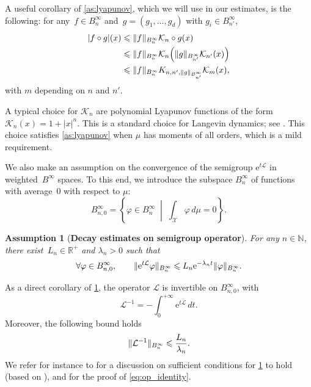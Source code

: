 \documentclass[11pt]{article}
\newcommand{\R}{\mathbb{R}}
\newcommand{\N}{\mathbb{N}}
\newcommand{\e}{\mathrm{e}}
\renewcommand{\L}{\mathcal{L}}
\renewcommand{\leq}{\leqslant}
\DeclarePairedDelimiter\norm{\lVert}{\rVert}
\DeclarePairedDelimiter\paren{\lparen}{\rparen}
\newtheorem{assumption}{Assumption}
\theoremstyle{definition}
\newcommand{\Binfz}{B_{n,0}^{\infty}}
\begin{document}
A useful corollary of \cref{as:lyapunov}, which we will use in our estimates, is the following: for any~$f\in B^\infty_{n}$ and~$g = (g_1,\dotsc,g_d)$ with $g_i \in B^\infty_{n'}$, 
\begin{align}
	|f\circ g|(x) &\leq \|f\|_{B_{n}^\infty}\mathcal{K}_{n} \circ g(x) \\
    &\leq \|f\|_{B_{n}^\infty}\mathcal{K}_{n}\paren*{\|g\|_{B^\infty_{n'}} \mathcal{K}_{n'}(x)} \\
    &\leq \norm{f}_{B^\infty_n}K_{n,n',\|g\|_{B^\infty_{n'}}}\mathcal{K}_{m}(x),
	\label{eq:lyap_composition_cor}
\end{align}
with $m$ depending on $n$ and $n'$.

A typical choice for $\mathcal{K}_n$ are polynomial Lyapunov functions of the form $\mathcal{K}_n(x) = 1+|x|^n$. This is a standard choice for Langevin dynamics; see \cite{mattingly2002,talay2002}. This choice satisfies \cref{as:lyapunov} when $\mu$ has moments of all orders, which is a mild requirement.

We also make an assumption on the convergence of the semigroup $\e^{t\L}$ in weighted~$B^\infty$ spaces. To this end, we introduce the subspace $B^\infty_n$ of functions with average~0 with respect to $\mu$:
\begin{equation}
    \Binfz = \left\{\varphi \in B^\infty_n \; \middle| \; \int_\mathcal{X} \varphi \, d\mu = 0\right\}.
\end{equation}

\begin{assumption}[{\bf Decay estimates on semigroup operator}]
  \label{as:decay_semigroup}
  For any $n\in\N$, there exist~$L_n \in \R^+$ and $\lambda_n>0$ such that
  \begin{equation}
    \forall \varphi\in \Binfz, \qquad \|\e^{t\L}\varphi\|_{B^\infty_n} \leq L_n\e^{-\lambda_n t}\norm{\varphi}_{B^\infty_n}.
    \label{eq:decay}
  \end{equation}
\end{assumption}

As a direct corollary of \cref{as:decay_semigroup}, the operator $\L$ is invertible on $\Binfz$, with
\begin{equation}
  \L^{-1} = -\int_0^{+\infty} \e^{t\L} \, dt.
  \label{eq:op_identity}
\end{equation}
Moreover, the following bound holds
\begin{equation}
  \norm{\L^{-1}}_{B^\infty_n} \leq \frac{L_n}{\lambda_n}.
  \label{eq:Linv_bound}
\end{equation}
We refer for instance to \cite[Section 2]{lelievre2016} for a discussion on sufficient conditions for \cref{as:decay_semigroup} to hold (based on \cite{reybellet2006,hairer2011}), and for the proof of \eqref{eq:op_identity}.
\end{document}
